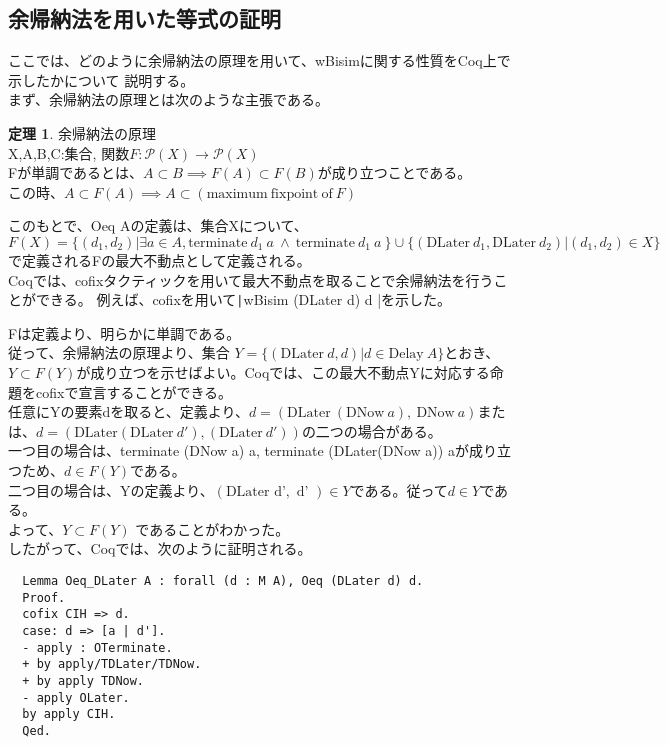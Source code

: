 \documentclass[japanese]{jssst_ppl}
\theoremstyle{definition}
\newtheorem{theorem}{定理}
\begin{document}
\subsection{余帰納法を用いた等式の証明}
ここでは、どのように余帰納法の原理を用いて、wBisimに関する性質をCoq上で示したかについて
説明する。\\
まず、余帰納法の原理とは次のような主張である。
\begin{theorem}{余帰納法の原理\\}
  X,A,B,C:集合,
  関数$F:\mathcal{P}(X) \to \mathcal{P}(X)$\\
  Fが単調であるとは、$A \subset B \implies F(A) \subset F(B)$が成り立つことである。\\
  この時、$A \subset F(A) \implies A \subset (\text{maximum} \ \text{fixpoint} \ \text{of} \ F)$
\end{theorem}
このもとで、Oeq Aの定義は、集合Xについて、$F(X) = \{ (d_1, d_2) | \exists a \in A, \text{terminate} \ d_1 \ a \ \land \ \text{terminate} \ d_1 \ a \ \} \cup \{ (\text{DLater} \ d_1, \text{DLater} \  d_2) | (d_1, d_2) \in X\}$
で定義されるFの最大不動点として定義される。\\
Coqでは、cofixタクティックを用いて最大不動点を取ることで余帰納法を行うことができる。
例えば、cofixを用いて\texttt|wBisim (DLater d) d |を示した。

Fは定義より、明らかに単調である。\\
従って、余帰納法の原理より、集合 $Y = \{ (\text{DLater} \ d, d) | d \in \text{Delay} \ A \} $とおき、
$Y \subset F (Y) $が成り立つを示せばよい。Coqでは、この最大不動点Yに対応する命題をcofixで宣言することができる。\\
任意にYの要素dを取ると、定義より、$d = (\text{DLater} \ (\text{DNow} \ a), \ \text{DNow} \ a)$または、$d = (\text{DLater} (\text{DLater} \ d'), (\text{DLater} \ d'))$の二つの場合がある。\\
一つ目の場合は、terminate (DNow a) a, terminate (DLater(DNow a)) aが成り立つため、$d \in F(Y)$である。\\
二つ目の場合は、Yの定義より、$ ( \text{DLater d'}, \text{ d' } ) \in Y$である。従って$ d \in Y $である。\\
よって、$Y \subset F (Y)$ であることがわかった。\\
したがって、Coqでは、次のように証明される。
\begin{verbatim}
  Lemma Oeq_DLater A : forall (d : M A), Oeq (DLater d) d.
  Proof.
  cofix CIH => d.
  case: d => [a | d'].
  - apply : OTerminate.
  + by apply/TDLater/TDNow.
  + by apply TDNow.
  - apply OLater.
  by apply CIH.
  Qed.
\end{verbatim}
\end{document}
